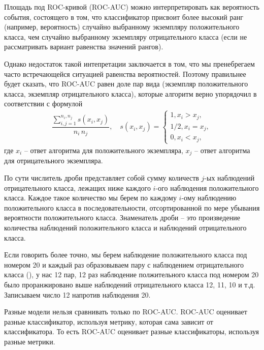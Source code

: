 \documentclass[%
	11pt,
	a4paper,
	utf8,
		]{article}
\begin{document}
Площадь под ROC-кривой (ROC-AUC) можно интерпретировать как вероятность события, состоящего в том, что классификатор присвоит более высокий ранг (например, вероятность) случайно выбранному экземпляру положительного класса, чем случайно выбранному экземпляру отрицательного класса (если не рассматривать вариант равенства значений рангов).


Однако недостаток такой интепретации заключается в том, что мы пренебрегаем часто встречающейся ситуацией равенства вероятностей. Поэтому правильнее будет сказать, что ROC-AUC равен доле пар вида (экземпляр положительного класса, экземпляр отрицательного класса), которые алгоритм верно упорядочил в соответствии с формулой
\begin{align}\label{eq:rocauc}
	\dfrac{ \sum\limits_{i, j=1}^{n_i, n_j} s(x_i, x_j)}{ n_i \, n_j }, \quad s(x_i, x_j) =
	\begin{cases}
		1, x_i > x_j,\\
		1/2, x_i = x_j,\\
		0, x_i < x_j,
	\end{cases}
\end{align}
где $ x_i $ -- ответ алгоритма для положительного экземпляра, $ x_j $ -- ответ алгоритма для отрицательного экземпляра.

По сути числитель дроби представляет собой сумму количеств $ j $-ых наблюдений отрицательного класса, лежащих ниже каждого $ i $-ого наблюдения положительного класса. Каждое такое количество мы берем по каждому $ i $-ому наблюдению положительного класса в последовательности, отсортированной по мере убывания вероятности положительного класса. Знаменатель дроби -- это произведение количества наблюдений положительного класса и наблюдений отрицательного класса.

Если говорить более точно, мы берем наблюдение положительного класса под номером 20 и каждый раз образовываем пару с наблюдением отрицательного класса (), у нас 12 пар, 12 раз наблюдение полжительного класса под номером 20 было проранжировано выше наблюдений отрицательного класса 12, 11, 10 и т.д. Записываем число 12 напротив наблюдения 20. 

Разные модели нельзя сравнивать только по ROC-AUC. ROC-AUC оценивает разные классификатор, используя метрику, которая сама зависит от классификатора. То есть ROC-AUC оценивает разные классификаторы, используя разные метрики.
\end{document}
